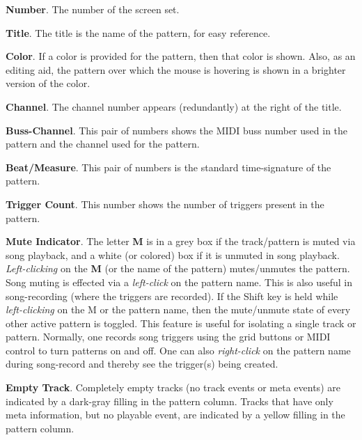    \begin{enumber}
      \item \textbf{Number}.
         The number of the screen set.
      \item \textbf{Title}.
         The title is the name of the pattern, for easy reference.
      \item \textbf{Color}.
         If a color is provided for the pattern, then that color is shown.
         Also, as an editing aid, the pattern over which the mouse is hovering
         is shown in a brighter version of the color.
      \item \textbf{Channel}.
         The channel number appears (redundantly)
         at the right of the title.
      \item \textbf{Buss-Channel}.
         This pair of numbers shows the MIDI buss number used in the pattern
         and the channel used for the pattern.
      \item \textbf{Beat/Measure}.
         This pair of numbers is the standard time-signature of the pattern.
      \item \textbf{Trigger Count}.
         This number shows the number of triggers present in the pattern.
      \item \textbf{Mute Indicator}.
         The letter \textbf{M} is in a grey box if the track/pattern
         is muted via song playback,
         and a white (or colored) box if it is unmuted in song playback.
         \textsl{Left-clicking} on the \textbf{M} (or the name of the pattern)
         mutes/unmutes the pattern.
         Song muting is effected via a \textsl{left-click} on the pattern name.
         This is also useful in song-recording (where the triggers are recorded).
         If the Shift key is held while \textsl{left-clicking}
         on the M or the pattern name, then
         the mute/unmute state of every other active pattern is toggled.
         This feature is useful for isolating a single track or pattern.
         Normally, one records song triggers using the grid buttons or MIDI
         control to turn patterns on and off.
         One can also \textsl{right-click} on the pattern
         name during song-record and
         thereby see the trigger(s) being created.
      \item \textbf{Empty Track}.
         Completely empty tracks (no track events or meta events)
         are indicated by a dark-gray filling in the pattern column.
         Tracks that have only meta information, but no playable event, are
         indicated by a yellow filling in the pattern column.
   \end{enumber}

